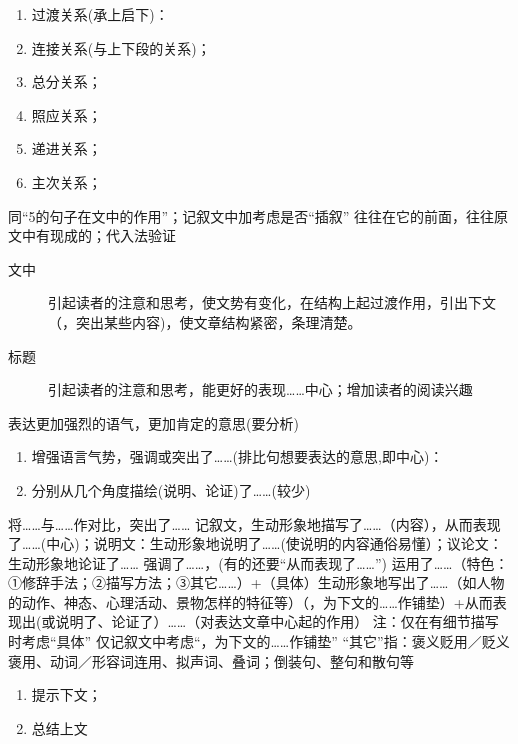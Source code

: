 \begin{enumerate}
\item 过渡关系(承上启下)：
\item 连接关系(与上下段的关系)；
\item 总分关系；
\item 照应关系；
\item 递进关系；
\item 主次关系；
\end{enumerate}
  同``5的句子在文中的作用''；记叙文中加考虑是否``插叙''
  往往在它的前面，往往原文中有现成的；代入法验证
\begin{description}
\item[文中]引起读者的注意和思考，使文势有变化，在结构上起过渡作用，引出下文（，突出某些内容)，使文章结构紧密，条理清楚。
\item[标题]引起读者的注意和思考，能更好的表现\ldots{}\ldots{}中心；增加读者的阅读兴趣
\end{description}
  表达更加强烈的语气，更加肯定的意思(要分析)
\begin{enumerate}
\item 增强语言气势，强调或突出了\ldots{}\ldots{}(排比句想要表达的意思,即中心)：
\item 分别从几个角度描绘(说明、论证)了\ldots{}\ldots{}(较少)
\end{enumerate}
  将\ldots{}\ldots{}与\ldots{}\ldots{}作对比，突出了\ldots{}\ldots{}
  记叙文，生动形象地描写了\ldots{}\ldots{}（内容），从而表现了\ldots{}\ldots{}(中心)；说明文：生动形象地说明了\ldots{}\ldots{}(使说明的内容通俗易懂）；议论文：生动形象地论证了\ldots{}\ldots{}
  强调了\ldots{}\ldots{}，(有的还要``从而表现了\ldots{}\ldots{}'')
  运用了\ldots{}\ldots{}（特色：①修辞手法；②描写方法；③其它\ldots{}\ldots{}）+（具体）生动形象地写出了\ldots{}\ldots{}（如人物的动作、神态、心理活动、景物怎样的特征等）（，为下文的\ldots{}\ldots{}作铺垫）+从而表现出(或说明了、论证了）\ldots{}\ldots{}（对表达文章中心起的作用）
  注：仅在有细节描写时考虑``具体''
      仅记叙文中考虑``，为下文的\ldots{}\ldots{}作铺垫''
  ``其它''指：褒义贬用／贬义褒用、动词／形容词连用、拟声词、叠词；倒装句、整句和散句等
\begin{enumerate}
\item 提示下文；
\item 总结上文
\end{enumerate}

